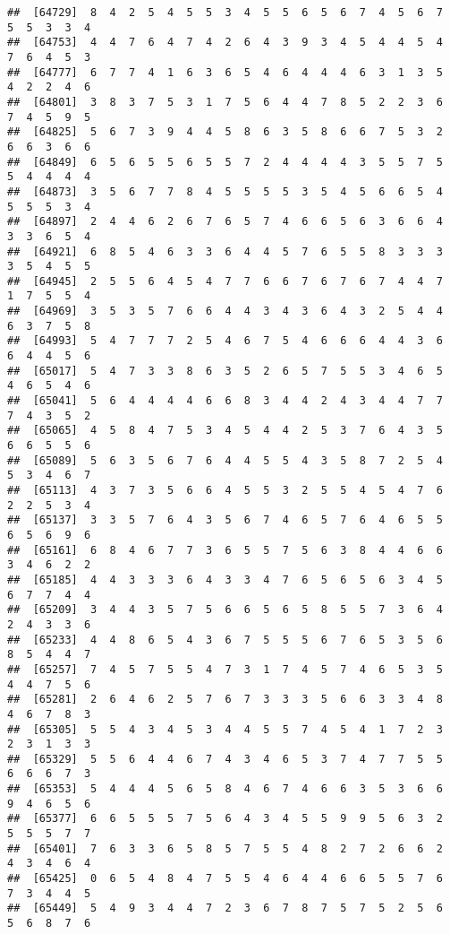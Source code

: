 \documentclass[
]{book}
\begin{document}
\begin{verbatim}
##  [64729]  8  4  2  5  4  5  5  3  4  5  5  6  5  6  7  4  5  6  7  5  5  3  3  4
##  [64753]  4  4  7  6  4  7  4  2  6  4  3  9  3  4  5  4  4  5  4  7  6  4  5  3
##  [64777]  6  7  7  4  1  6  3  6  5  4  6  4  4  4  6  3  1  3  5  4  2  2  4  6
##  [64801]  3  8  3  7  5  3  1  7  5  6  4  4  7  8  5  2  2  3  6  7  4  5  9  5
##  [64825]  5  6  7  3  9  4  4  5  8  6  3  5  8  6  6  7  5  3  2  6  6  3  6  6
##  [64849]  6  5  6  5  5  6  5  5  7  2  4  4  4  4  3  5  5  7  5  5  4  4  4  4
##  [64873]  3  5  6  7  7  8  4  5  5  5  5  3  5  4  5  6  6  5  4  5  5  5  3  4
##  [64897]  2  4  4  6  2  6  7  6  5  7  4  6  6  5  6  3  6  6  4  3  3  6  5  4
##  [64921]  6  8  5  4  6  3  3  6  4  4  5  7  6  5  5  8  3  3  3  3  5  4  5  5
##  [64945]  2  5  5  6  4  5  4  7  7  6  6  7  6  7  6  7  4  4  7  1  7  5  5  4
##  [64969]  3  5  3  5  7  6  6  4  4  3  4  3  6  4  3  2  5  4  4  6  3  7  5  8
##  [64993]  5  4  7  7  7  2  5  4  6  7  5  4  6  6  6  4  4  3  6  6  4  4  5  6
##  [65017]  5  4  7  3  3  8  6  3  5  2  6  5  7  5  5  3  4  6  5  4  6  5  4  6
##  [65041]  5  6  4  4  4  4  6  6  8  3  4  4  2  4  3  4  4  7  7  7  4  3  5  2
##  [65065]  4  5  8  4  7  5  3  4  5  4  4  2  5  3  7  6  4  3  5  6  6  5  5  6
##  [65089]  5  6  3  5  6  7  6  4  4  5  5  4  3  5  8  7  2  5  4  5  3  4  6  7
##  [65113]  4  3  7  3  5  6  6  4  5  5  3  2  5  5  4  5  4  7  6  2  2  5  3  4
##  [65137]  3  3  5  7  6  4  3  5  6  7  4  6  5  7  6  4  6  5  5  6  5  6  9  6
##  [65161]  6  8  4  6  7  7  3  6  5  5  7  5  6  3  8  4  4  6  6  3  4  6  2  2
##  [65185]  4  4  3  3  3  6  4  3  3  4  7  6  5  6  5  6  3  4  5  6  7  7  4  4
##  [65209]  3  4  4  3  5  7  5  6  6  5  6  5  8  5  5  7  3  6  4  2  4  3  3  6
##  [65233]  4  4  8  6  5  4  3  6  7  5  5  5  6  7  6  5  3  5  6  8  5  4  4  7
##  [65257]  7  4  5  7  5  5  4  7  3  1  7  4  5  7  4  6  5  3  5  4  4  7  5  6
##  [65281]  2  6  4  6  2  5  7  6  7  3  3  3  5  6  6  3  3  4  8  4  6  7  8  3
##  [65305]  5  5  4  3  4  5  3  4  4  5  5  7  4  5  4  1  7  2  3  2  3  1  3  3
##  [65329]  5  5  6  4  4  6  7  4  3  4  6  5  3  7  4  7  7  5  5  6  6  6  7  3
##  [65353]  5  4  4  4  5  6  5  8  4  6  7  4  6  6  3  5  3  6  6  9  4  6  5  6
##  [65377]  6  6  5  5  5  7  5  6  4  3  4  5  5  9  9  5  6  3  2  5  5  5  7  7
##  [65401]  7  6  3  3  6  5  8  5  7  5  5  4  8  2  7  2  6  6  2  4  3  4  6  4
##  [65425]  0  6  5  4  8  4  7  5  5  4  6  4  4  6  6  5  5  7  6  7  3  4  4  5
##  [65449]  5  4  9  3  4  4  7  2  3  6  7  8  7  5  7  5  2  5  6  5  6  8  7  6

\end{verbatim}
\end{document}
